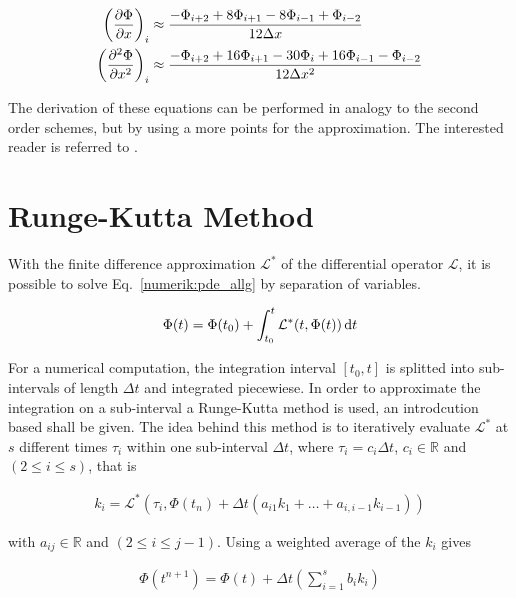 \begin{align}
    \left(\pdn[\Phi]{x}\right)_i &\approx \frac{-\Phi_{i+2} + 8\Phi_{i+1} - 8\Phi_{i-1} + \Phi_{i-2}}{12\Delta x} \\
    \left(\pdn[^2\Phi]{x^2}\right)_i &\approx \frac{-\Phi_{i+2} + 16\Phi_{i+1} -30\Phi_i + 16\Phi_{i-1} - \Phi_{i-2}}{12\Delta x^2}
    \label{num:fd_o4_methods}
\end{align}

The derivation of these equations can be performed in analogy to the second order schemes, but by using a more points for the
approximation. The interested reader is referred to \citep{Fornberg1988}.

\newpage

\section{Runge-Kutta Method}
\label{numerik:rk_williamson_sec}

With the finite difference approximation $\mathcal{L^*}$ of the differential operator $\mathcal{L}$,
it is possible to solve Eq.~\ref{numerik:pde_allg} by separation of variables.

\begin{align}
    \Phi(t) = \Phi(t_0) + \int_{t_0}^{t} \mathcal{L^*} (t, \Phi(t)) \mathop{}\!\mathrm{d} t
\end{align}

For a numerical computation, the integration interval $[t_0, t]$  is splitted into sub-intervals  of length $\Delta t$ and integrated piecewiese.
In order to approximate the integration on a sub-interval a Runge-Kutta method is used, an introdcution based \citep{Sarbach2012} shall be given.
The idea behind this method is to iteratively evaluate $\mathcal{L^*}$ at $s$ different times $\tau_i$ within one sub-interval $\Delta t$,
where $\tau_i=c_i \Delta t$, $c_i \in \mathbb{R}$ and  $(2\leq i \leq s)$, that is

\begin{align}
 k_i = \mathcal{L^*} \left(\tau_i, \Phi(t_n) + \Delta t \left(a_{i1} k_{1} + \dots + a_{i, i-1} k_{i-1} \right)\right)
\end{align}

with  $a_{ij} \in \mathbb{R}$ and $(2\leq i \leq j -1 )$.
Using a  weighted average of the $k_i$  gives

\begin{align}
    \Phi(t^{n+1}) = \Phi(t) + \Delta t \left( \sum_{i=1}^s b_i k_i \right)
\end{align}

